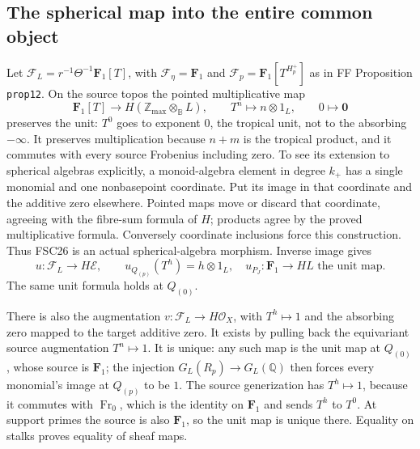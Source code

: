 \subsection{The spherical map into the entire common object}
Let $\mathcal F_L=r^{-1}\Theta^{-1}\mathbf F_1[T]$, with
$\mathcal F_\eta=\mathbf F_1$ and
$\mathcal F_p=\mathbf F_1[T^{H_p^+}]$ as in FF Proposition
\texttt{prop12}. On the source topos the pointed multiplicative map
\begin{equation}\tag{FSC26}
 \mathbf F_1[T]\longrightarrow H(\mathbb Z_{\max}\otimes_{\mathbb B}L),
 \qquad T^n\longmapsto n\otimes1_L,\qquad
 0\longmapsto\mathbf0
\end{equation}
preserves the unit: $T^0$ goes to exponent $0$, the tropical unit,
not to the absorbing $-\infty$. It preserves multiplication because
$n+m$ is the tropical product, and it commutes with every source
Frobenius including zero. To see its extension to spherical algebras
explicitly, a monoid-algebra element in degree $k_+$ has a single
monomial and one nonbasepoint coordinate. Put its image in that
coordinate and the additive zero elsewhere. Pointed maps move or
discard that coordinate, agreeing with the fibre-sum formula of $H$;
products agree by the proved multiplicative formula. Conversely
coordinate inclusions force this construction. Thus FSC26 is an
actual spherical-algebra morphism. Inverse image gives
\begin{equation}\tag{FSC27}
 u:\mathcal F_L\longrightarrow H\mathcal E,
 \qquad u_{Q_{(p)}}(T^h)=h\otimes1_L,
 \quad u_{P_J}:\mathbf F_1\to HL\text{ the unit map}.
\end{equation}
The same unit formula holds at $Q_{(0)}$.

There is also the augmentation
$v:\mathcal F_L\to H\mathcal O_X$, with $T^h\mapsto1$ and the
absorbing zero mapped to the target additive zero. It exists by
pulling back the equivariant source augmentation $T^n\mapsto1$.
It is unique: any such map is the unit map at $Q_{(0)}$, whose
source is $\mathbf F_1$; the injection
$G_L(R_p)\to G_L(\mathbb Q)$ then forces every monomial's image at
$Q_{(p)}$ to be $1$. The source generization has $T^h\mapsto1$,
because it commutes with $\operatorname{Fr}_0$, which is the identity
on $\mathbf F_1$ and sends $T^h$ to $T^0$. At support primes the source
is also $\mathbf F_1$, so the unit map is unique there. Equality on
stalks proves equality of sheaf maps.

